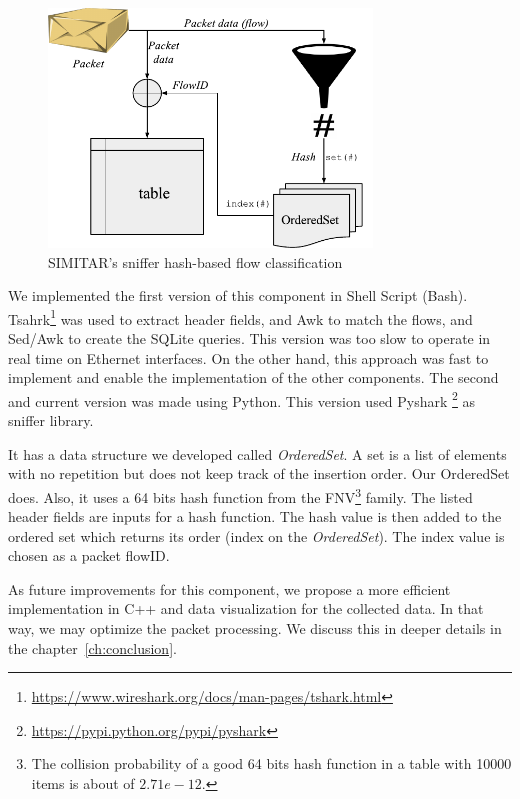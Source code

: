 \begin{figure}[ht!]
        \centering
        \includegraphics[height=2.5in]{figures/ch3/sniffer-classifier}
        \caption{SIMITAR's sniffer hash-based flow classification}
    \label{fig:sniffer}
\end{figure}


We implemented the first version of this component in Shell Script (Bash).  Tsahrk\footnote{\href{https://www.wireshark.org/docs/man-pages/tshark.html}{https://www.wireshark.org/docs/man-pages/tshark.html}} was used to extract header fields, and Awk to match the flows, and Sed/Awk to create the SQLite queries. This version was too slow to operate in real time on Ethernet interfaces. On the other hand, this approach was fast to implement and enable the implementation of the other components. The second and current version was made using Python. This version used Pyshark \footnote{\href{https://pypi.python.org/pypi/pyshark}{https://pypi.python.org/pypi/pyshark}} as sniffer library.  


It has a data structure we developed called \textit{OrderedSet}. A set is a list of elements with no repetition but does not keep track of the insertion order. Our OrderedSet does. Also, it uses a  64 bits hash function from the FNV\footnote{The collision probability of a good 64 bits hash function in a table with 10000 items is about of $2.71e-12$.} family. The listed header fields are inputs for a hash function. The hash value is then added to the ordered set which returns its order (index on the \textit{OrderedSet}). The index value is chosen as a packet flowID.  


As future improvements for this component, we propose a more efficient implementation in C++ and data visualization for the collected data. In that way, we may optimize the packet processing. We discuss this in deeper details in the chapter~\ref{ch:conclusion}.


